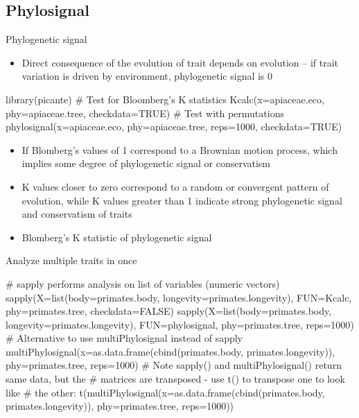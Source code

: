 \documentclass[compress, ucs, xelatex, 11pt, xcolor=svgnames,
  hyperref={
    bookmarks=true,
    unicode=true,
    colorlinks=true,
    pdftitle={Molecular data in R},
    plainpages=false,
    pdfauthor={Vojtech Zeisek},
    pdfsubject={Course about phylogeny and evolution in R},
    pdfcreator={XeLaTeX},
    pdfkeywords={R, evolution, phylogeny, molecular data},
    linkcolor=Tomato,
    anchorcolor=SaddleBrown,
    citecolor=Goldenrod,
    filecolor=DarkMagenta,
    menucolor=Sienna,
    urlcolor=DarkTurquoise,
    pdftex},
  url={hyphens, lowtilde} %
  ]{beamer}
\begin{document}
\subsection{Phylosignal}

\begin{frame}[fragile]{Phylogenetic signal}
  \begin{itemize}
    \item Direct consequence of the evolution of trait depends on evolution -- if trait variation is driven by environment, phylogenetic signal is 0
  \end{itemize}
  \begin{spluscode}
    library(picante)
    # Test for Bloomberg's K statistics
    Kcalc(x=apiaceae.eco, phy=apiaceae.tree, checkdata=TRUE)
    # Test with permutations
    phylosignal(x=apiaceae.eco, phy=apiaceae.tree, reps=1000,
      checkdata=TRUE)
  \end{spluscode}
  \begin{itemize}
    \item If Blomberg's values of 1 correspond to a Brownian motion process, which implies some degree of phylogenetic signal or conservatism
    \item K values closer to zero correspond to a random or convergent pattern of evolution, while K values greater than 1 indicate strong phylogenetic signal and conservatism of traits
    \item Blomberg's K statistic of phylogenetic signal
  \end{itemize}
\end{frame}

\begin{frame}[fragile]{Analyze multiple traits in once}
  \begin{spluscode}
    # sapply performs analysis on list of variables (numeric vectors)
    sapply(X=list(body=primates.body, longevity=primates.longevity),
      FUN=Kcalc, phy=primates.tree, checkdata=FALSE)
    sapply(X=list(body=primates.body, longevity=primates.longevity),
      FUN=phylosignal, phy=primates.tree, reps=1000)
    # Alternative to use multiPhylosignal instead of sapply
    multiPhylosignal(x=as.data.frame(cbind(primates.body,
      primates.longevity)), phy=primates.tree, reps=1000)
    # Note sapply() and multiPhylosignal() return same data, but the
    # matrices are transposed - use t() to transpose one to look like
    # the other:
    t(multiPhylosignal(x=as.data.frame(cbind(primates.body,
      primates.longevity)), phy=primates.tree, reps=1000))
  \end{spluscode}
\end{frame}
\end{document}
